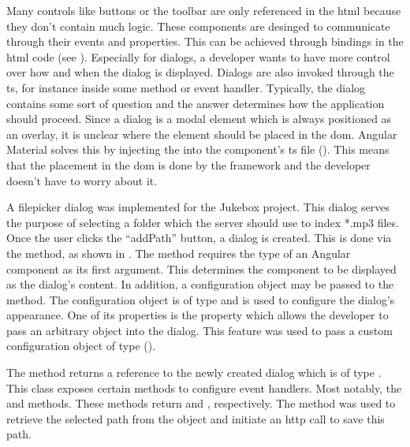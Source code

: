 
Many controls like buttons or the toolbar are only referenced in the \gls{html} because they don't contain much logic. These components are desinged to communicate through their events and properties. This can be achieved through bindings in the \gls{html} code (see ). Especially for dialogs, a developer wants to have more control over how and when the dialog is displayed. Dialogs are also invoked through the \gls{ts}, for instance inside some method or event handler. Typically, the dialog contains some sort of question and the answer determines how the application should proceed. Since a dialog is a modal element which is always positioned as an overlay, it is unclear where the element should be placed in the \gls{dom}. Angular Material solves this by injecting the  into the component's \gls{ts} file (). This means that the placement in the \gls{dom} is done by the framework and the developer doesn't have to worry about it.

A filepicker dialog was implemented for the Jukebox project. This dialog serves the purpose of selecting a folder which the server should use to index *.mp3 files. Once the user clicks the \enquote{addPath} button, a dialog is created. This is done via the  method, as shown in . The  method requires the type of an Angular component as its first argument. This determines the component to be displayed as the dialog's content. In addition, a configuration object may be passed to the method. The configuration object is of type  and is used to configure the dialog's appearance. One of its properties is the  property which allows the developer to pass an arbitrary object into the dialog. This feature was used to pass a custom configuration object of type  ().

The  method returns a reference to the newly created dialog which is of type . This class exposes certain methods to configure event handlers. Most notably, the  and  methods. These methods return  and , respectively. The  method was used to retrieve the selected path from the  object and initiate an \gls{http} call to save this path.

